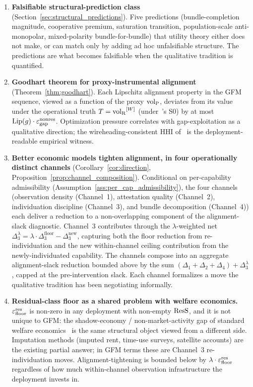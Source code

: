 \begin{enumerate}
\item \textbf{Falsifiable structural-prediction class}
  (Section~\ref{sec:structural_predictions}).  Five predictions
  (bundle-completion magnitude, cooperative premium, saturation
  transition, population-scale anti-monopolar, mixed-polarity
  bundle-for-bundle) that utility theory either does not make,
  or can match only by adding ad hoc unfalsifiable structure.
  The predictions are what becomes falsifiable when the
  qualitative tradition is quantified.

\item \textbf{Goodhart theorem for proxy-instrumental alignment}
  (Theorem~\ref{thm:goodhart}).  Each Lipschitz alignment
  property in the GFM sequence, viewed as a function of the
  proxy ${\operatorname{vol}_{\mathrm{P}}}$, deviates from its value under the operational
  truth $T = {\operatorname{vol}_{\mathrm{R}}}^{[W]}$ (under~\citep[Revealed~Sacrifice]{lasser2026paper8a}'s
  S0) by at most $\mathrm{Lip}(g) \cdot \varepsilon_{\mathrm{gap}}^{\mathrm{nonres}}$.
  Optimization pressure correlates with gap-exploitation as a
  qualitative direction; the wireheading-consistent HHI
  of~\citep[Need~Sufficiency]{lasser2026paper8b} is the
  deployment-readable empirical witness.

\item \textbf{Better economic models tighten alignment, in four
  operationally distinct channels}
  (Corollary~\ref{cor:direction},
  Proposition~\ref{prop:channel_composition}).  Conditional on
  per-capability admissibility
  (Assumption~\ref{ass:per_cap_admissibility}), the four
  channels (observation density (Channel~1), attestation
  quality (Channel~2), individuation discipline (Channel~3),
  and bundle decomposition (Channel~4)) each deliver a
  reduction to a non-overlapping component of the
  alignment-slack diagnostic.  Channel~3 contributes through the
  $\lambda$-weighted net
  $\Delta_3^{\lambda} = \lambda \cdot \Delta_3^{\mathrm{floor}} -
  \Delta_3^{\mathrm{new}}$, capturing both the floor reduction
  from re-individuation and the new within-channel ceiling
  contribution from the newly-individuated capability.  The
  channels compose into an aggregate alignment-slack reduction
  bounded above by the sum
  $(\Delta_1 + \Delta_2 + \Delta_4) + \Delta_3^{\lambda}$,
  capped at the pre-intervention slack.  Each channel formalizes
  a move the qualitative tradition has been negotiating
  informally.

\item \textbf{Residual-class floor as a shared problem with
  welfare economics.}  $\varepsilon_{\mathrm{floor}}^{\mathrm{res}}$ is non-zero in any
  deployment with non-empty $\mathrm{ResS}$, and it is not unique to
  GFM: the shadow-economy / non-market-activity gap of standard
  welfare economics~\citep{stiglitz2009report} is the same
  structural object viewed from a different side.  Imputation
  methods (imputed rent, time-use surveys, satellite accounts)
  are the existing partial answer; in GFM terms these are
  Channel~3 re-individuation moves.  Alignment-tightening is
  bounded below by $\lambda \cdot \varepsilon_{\mathrm{floor}}^{\mathrm{res}}$ regardless of how
  much within-channel observation infrastructure the deployment
  invests in.
\end{enumerate}

